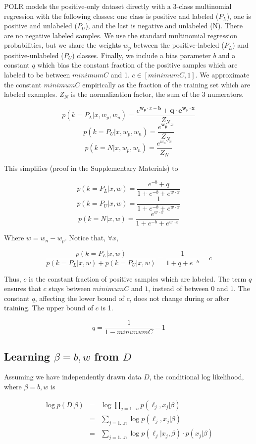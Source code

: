 \documentclass{article}
\begin{document}
POLR models the positive-only dataset directly with a 3-class multinomial regression with the following classes: one class is positive and labeled ($P_L$), one is positive and unlabeled ($P_U$), and the last is negative and unlabeled (N).  There are no negative labeled samples.  We use the standard multinomial regression probabilities, but we share the weights $w_p$ between the positive-labeled ($P_L$) and positive-unlabeled ($P_U$) classes. Finally, we include a bias parameter $b$ and a constant $q$ which bias the constant fraction of the positive samples which are labeled to be between $minimumC$ and 1. $c \in [minimumC, 1]$.  We approximate the constant $minimumC$ empirically as the fraction of the training set which are labeled examples.  $Z_N$ is the normalization factor, the sum of the 3 numerators.

$$p(k=P_L | x, w_p, w_n) =  \frac{e^{\mathbf{w_p} \cdot x - \mathbf{b}} + \mathbf{q \cdot e^{w_p \cdot x}}}{Z_N}$$
$$p(k=P_U | x, w_p, w_n) =  \frac{e^{\mathbf{w_p} \cdot x}}{Z_N}$$
$$p(k=N | x, w_p, w_n) =  \frac{e^{w_n \cdot x}}{Z_N}$$

This simplifies (proof in the Supplementary Materials) to

$$ p(k=P_L | x, w) = \frac{e^{-b} + q}{1 + e^{-b} + e^{w \cdot x}}$$
$$ p(k=P_U | x, w) =  \frac{1}{1 + e^{-b} + e^{w \cdot x}}$$
$$ p(k=N | x, w) = \frac{e^{w \cdot x}}{1 + e^{-b} + e^{w \cdot x}}$$

Where $w = w_n - w_p$. Notice that, $\forall x$,

$$\frac{p(k=P_L | x, w)}{p(k=P_L | x, w) + p(k=P_U | x, w)} = \frac{1}{1 + q + e^{-b}} = c$$

Thus, $c$ is the constant fraction of positive samples which are labeled. The term $q$ ensures that $c$ stays between $minimumC$ and $1$, instead of  between $0$ and $1$.  The constant $q$, affecting the lower bound of $c$, does not change during or after training. The upper bound of $c$ is 1.

$$q = \frac{1}{1 - minimumC} - 1$$

\subsection{Learning $\beta = b, w$ from $D$}

Assuming we have independently drawn data $D$, the conditional log likelihood, where $\beta = b, w$ is \cite{carpenter08}

\begin{eqnarray*}
\log{p(D | \beta)} &=& \log \prod_{j=1...n}{p(\ell_j, x_j | \beta)} \\
 &=& \sum_{j=1...n}{\log{p(\ell_j, x_j | \beta)}} \\
 &=& \sum_{j=1...n}{\log{p(\ell_j | x_j, \beta)}} \cdot p(x_j | \beta)
\end{eqnarray*}
\end{document}
